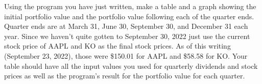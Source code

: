 
\bigskip

\noindent Using the program you have just written, make a table and a graph showing the initial portfolio value and the portfolio value following each of the quarter ends. Quarter ends are at March 31, June 30, September 30, and December 31 each year. Since we haven't quite gotten to September 30, 2022 just use the current stock price of AAPL and KO as the final stock prices. As of this writing (September 23, 2022), those were \$150.01 for AAPL and \$58.58 for KO. Your table should have all the input values you used for quarterly dividends and stock prices as well as the program's result for the portfolio value for each quarter.

\bigskip

\bye
